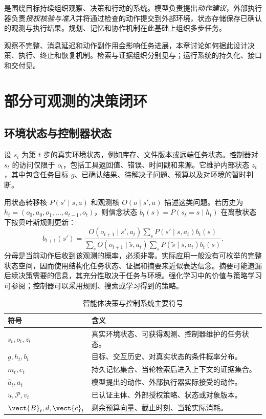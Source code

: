 \documentclass[../textbook.tex]{subfiles}
\begin{document}
\fi
{}

是围绕目标持续组织观察、决策和行动的系统。模型负责提出\emph{动作建议}，外部执行器负责\emph{授权核验与准入}并将通过检查的动作提交到外部环境，状态存储保存已确认的观测与执行结果。规划、记忆和协作机制在此基础上组织多步任务。

观察不完整、消息延迟和动作副作用会影响任务进展，本章讨论如何据此设计决策、执行、终止和恢复机制。检索与证据组织分别见与；运行系统的持久化、接口和交付见。

\section{部分可观测的决策闭环}

\subsection{环境状态与控制器状态}
设 $s_t$ 为第 $t$ 步的真实环境状态，例如库存、文件版本或远端任务状态。控制器对 $s_t$ 的访问仅限于 $o_t$，包括工具返回值、错误、时间戳和来源。它维护内部状态 $z_t$，其中包含任务目标 $g$、已确认结果、待解决子问题、预算以及对环境的暂时判断。

用状态转移核 $P(s'\mid s,a)$ 和观测核 $O(o\mid s',a)$ 描述这类问题。若历史为 $h_t=(o_0,a_0,o_1,\ldots,a_{t-1},o_t)$，则信念状态 $b_t(s)=P(s_t=s\mid h_t)$ 在离散状态下按贝叶斯规则更新：
\begin{equation}
 b_{t+1}(s')=\frac{O(o_{t+1}\mid s',a_t)\sum_sP(s'\mid s,a_t)b_t(s)}{\sum_{\tilde s}O(o_{t+1}\mid\tilde s,a_t)\sum_sP(\tilde s\mid s,a_t)b_t(s)}.
 \label{eq:agent-belief}
\end{equation}
分母是当前动作后收到该观测的概率，必须非零。实际应用一般没有可枚举的完整状态空间，因而使用结构化任务状态、证据和摘要来近似表达信念。摘要可能遗漏后续决策需要的信息，其充分性取决于任务与环境。强化学习中的价值与策略学习可参阅；控制器可以采用规则、搜索或学习得到的策略。

\begin{table}[htbp]
\centering
\caption{智能体决策与控制系统主要符号}
\label{tab:agent-symbols}
\begin{tabular}{ll}
\toprule
符号 & 含义\\
\midrule
$s_t,o_t,z_t$ & 真实环境状态、可获得观测、控制器维护的任务状态。\\
$g,h_t,b_t$ & 目标、交互历史、对真实状态的条件概率分布。\\
$m_t,e_t$ & 持久记忆集合、当轮检索后进入上下文的证据集合。\\
$\hat a_t,a_t$ & 模型提出的动作、外部执行器实际接受的动作。\\
$u,\mathcal P,v_t$ & 已认证主体、外部授权策略、状态或对象版本。\\
$\vect{B}_t,d,\vect{c}_t$ & 剩余预算向量、截止时刻、当轮实际消耗。\\
\bottomrule
\end{tabular}
\end{table}
\end{document}
